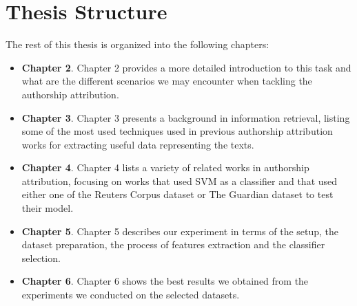 \section{Thesis Structure}
The rest of this thesis is organized into the following chapters:
\begin{itemize}
	\item \textbf{Chapter 2}. Chapter 2 provides a more detailed introduction to this task and what are the different scenarios we may encounter when tackling the authorship attribution.
	\item \textbf{Chapter 3}. Chapter 3 presents a background in information retrieval, listing some of the most used techniques used in previous authorship attribution works for extracting useful data representing the texts.
	\item \textbf{Chapter 4}. Chapter 4 lists a variety of related works in authorship attribution, focusing on works that used SVM as a classifier and that used either one of the Reuters Corpus dataset or The Guardian dataset to test their model.
	\item \textbf{Chapter 5}. Chapter 5 describes our experiment in terms of the setup, the dataset preparation, the process of features extraction and the classifier selection.
	\item \textbf{Chapter 6}. Chapter 6 shows the best results we obtained from the experiments we conducted on the selected datasets.
\end{itemize}